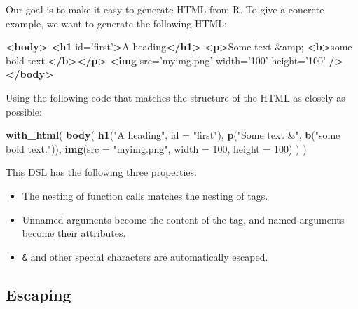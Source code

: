 \documentclass[]{book}
\newenvironment{Shaded}{\begin{snugshade}}{\end{snugshade}}
\newcommand{\DataTypeTok}[1]{\textcolor[rgb]{0.27,0.27,0.27}{#1}}
\newcommand{\DecValTok}[1]{\textcolor[rgb]{0.06,0.06,0.06}{#1}}
\newcommand{\KeywordTok}[1]{\textcolor[rgb]{0.27,0.27,0.27}{\textbf{#1}}}
\newcommand{\NormalTok}[1]{#1}
\newcommand{\OtherTok}[1]{\textcolor[rgb]{0.37,0.37,0.37}{#1}}
\newcommand{\StringTok}[1]{\textcolor[rgb]{0.5,0.5,0.5}{#1}}
\begin{document}
Our goal is to make it easy to generate HTML from R. To give a concrete example, we want to generate the following HTML:

\begin{Shaded}
\begin{Highlighting}[]
\KeywordTok{<body>}
  \KeywordTok{<h1}\OtherTok{ id=}\StringTok{'first'}\KeywordTok{>}\NormalTok{A heading}\KeywordTok{</h1>}
  \KeywordTok{<p>}\NormalTok{Some text }\DecValTok{&amp;} \KeywordTok{<b>}\NormalTok{some bold text.}\KeywordTok{</b></p>}
  \KeywordTok{<img}\OtherTok{ src=}\StringTok{'myimg.png'}\OtherTok{ width=}\StringTok{'100'}\OtherTok{ height=}\StringTok{'100'} \KeywordTok{/>}
\KeywordTok{</body>}
\end{Highlighting}
\end{Shaded}

Using the following code that matches the structure of the HTML as closely as possible:

\begin{Shaded}
\begin{Highlighting}[]
\KeywordTok{with_html}\NormalTok{(}
  \KeywordTok{body}\NormalTok{(}
    \KeywordTok{h1}\NormalTok{(}\StringTok{"A heading"}\NormalTok{, }\DataTypeTok{id =} \StringTok{"first"}\NormalTok{),}
    \KeywordTok{p}\NormalTok{(}\StringTok{"Some text &"}\NormalTok{, }\KeywordTok{b}\NormalTok{(}\StringTok{"some bold text."}\NormalTok{)),}
    \KeywordTok{img}\NormalTok{(}\DataTypeTok{src =} \StringTok{"myimg.png"}\NormalTok{, }\DataTypeTok{width =} \DecValTok{100}\NormalTok{, }\DataTypeTok{height =} \DecValTok{100}\NormalTok{)}
\NormalTok{  )}
\NormalTok{)}
\end{Highlighting}
\end{Shaded}

This DSL has the following three properties:

\begin{itemize}
\item
  The nesting of function calls matches the nesting of tags.
\item
  Unnamed arguments become the content of the tag, and named arguments
  become their attributes.
\item
  \texttt{\&} and other special characters are automatically escaped.
\end{itemize}

\hypertarget{escaping}{%
\subsection{Escaping}\label{escaping}}
\end{document}
